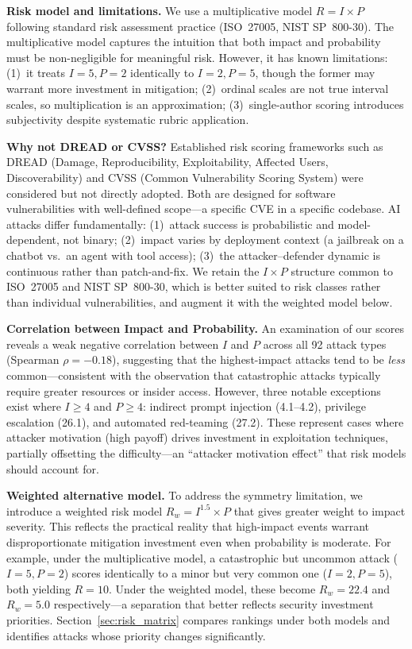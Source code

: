 \documentclass[conference]{IEEEtran}
\begin{document}
\textbf{Risk model and limitations.} We use a multiplicative model $R = I \times P$ following standard risk assessment practice (ISO~27005, NIST SP~800-30). The multiplicative model captures the intuition that both impact and probability must be non-negligible for meaningful risk. However, it has known limitations: (1)~it treats $I{=}5, P{=}2$ identically to $I{=}2, P{=}5$, though the former may warrant more investment in mitigation; (2)~ordinal scales are not true interval scales, so multiplication is an approximation; (3)~single-author scoring introduces subjectivity despite systematic rubric application.

\textbf{Why not DREAD or CVSS?} Established risk scoring frameworks such as DREAD (Damage, Reproducibility, Exploitability, Affected Users, Discoverability) and CVSS (Common Vulnerability Scoring System) were considered but not directly adopted. Both are designed for software vulnerabilities with well-defined scope---a specific CVE in a specific codebase. AI attacks differ fundamentally: (1)~attack success is probabilistic and model-dependent, not binary; (2)~impact varies by deployment context (a jailbreak on a chatbot vs.\ an agent with tool access); (3)~the attacker--defender dynamic is continuous rather than patch-and-fix. We retain the $I \times P$ structure common to ISO~27005 and NIST SP~800-30, which is better suited to risk classes rather than individual vulnerabilities, and augment it with the weighted model below.

\textbf{Correlation between Impact and Probability.} An examination of our scores reveals a weak negative correlation between $I$ and $P$ across all 92 attack types (Spearman $\rho = -0.18$), suggesting that the highest-impact attacks tend to be \emph{less} common---consistent with the observation that catastrophic attacks typically require greater resources or insider access. However, three notable exceptions exist where $I \geq 4$ and $P \geq 4$: indirect prompt injection (4.1--4.2), privilege escalation (26.1), and automated red-teaming (27.2). These represent cases where attacker motivation (high payoff) drives investment in exploitation techniques, partially offsetting the difficulty---an ``attacker motivation effect'' that risk models should account for.

\textbf{Weighted alternative model.} To address the symmetry limitation, we introduce a weighted risk model $R_w = I^{1.5} \times P$ that gives greater weight to impact severity. This reflects the practical reality that high-impact events warrant disproportionate mitigation investment even when probability is moderate. For example, under the multiplicative model, a catastrophic but uncommon attack ($I{=}5, P{=}2$) scores identically to a minor but very common one ($I{=}2, P{=}5$), both yielding $R{=}10$. Under the weighted model, these become $R_w{=}22.4$ and $R_w{=}5.0$ respectively---a separation that better reflects security investment priorities. Section~\ref{sec:risk_matrix} compares rankings under both models and identifies attacks whose priority changes significantly.
\end{document}
